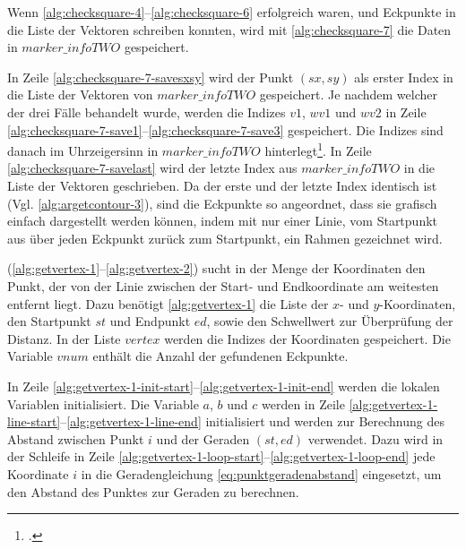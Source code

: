


Wenn \autoref{alg:checksquare-4}--\autoref{alg:checksquare-6} erfolgreich waren, und Eckpunkte in die Liste der
 Vektoren schreiben konnten, wird mit \autoref{alg:checksquare-7} die Daten in $\mathit{marker\_infoTWO}$ gespeichert.



In Zeile \ref{alg:checksquare-7-savesxsy} wird der Punkt $(\mathit{sx},\mathit{sy})$ als erster Index in die Liste der
 Vektoren von $\mathit{marker\_infoTWO}$ gespeichert. Je nachdem welcher der drei Fälle behandelt wurde, werden die
 Indizes $\mathit{v1}$, $\mathit{wv1}$ und $\mathit{wv2}$ in Zeile
 \ref{alg:checksquare-7-save1}--\ref{alg:checksquare-7-save3} gespeichert. Die Indizes sind danach im Uhrzeigersinn in
 $\mathit{marker\_infoTWO}$ hinterlegt\footcite[Vgl.][S.~44]{wagner07a}. In Zeile \ref{alg:checksquare-7-savelast} wird
 der letzte Index aus $\mathit{marker\_infoTWO}$ in die Liste der Vektoren geschrieben. Da der erste und der letzte
 Index identisch ist (Vgl. \autoref{alg:argetcontour-3}), sind die Eckpunkte so angeordnet, dass sie grafisch einfach
 dargestellt werden können, indem mit nur einer Linie, vom Startpunkt aus über jeden Eckpunkt zurück zum Startpunkt,
 ein Rahmen gezeichnet wird.

 (\autoref{alg:getvertex-1}--\autoref{alg:getvertex-2}) sucht in der Menge der Koordinaten den
 Punkt, der von der Linie zwischen der Start- und Endkoordinate am weitesten entfernt liegt. Dazu benötigt
 \autoref{alg:getvertex-1} die Liste der $x$- und $y$-Koordinaten, den Startpunkt $\mathit{st}$ und Endpunkt
 $\mathit{ed}$, sowie den Schwellwert zur Überprüfung der Distanz. In der Liste $\mathit{vertex}$ werden die Indizes
 der Koordinaten gespeichert. Die Variable $\mathit{vnum}$ enthält die Anzahl der gefundenen Eckpunkte.



In Zeile \ref{alg:getvertex-1-init-start}--\ref{alg:getvertex-1-init-end} werden die lokalen Variablen initialisiert.
 Die Variable $a$, $b$ und $c$ werden in Zeile \ref{alg:getvertex-1-line-start}--\ref{alg:getvertex-1-line-end}
 initialisiert und werden zur Berechnung des Abstand zwischen Punkt $i$ und der Geraden $(\mathit{st},\mathit{ed})$
 verwendet. Dazu wird in der Schleife in Zeile \ref{alg:getvertex-1-loop-start}--\ref{alg:getvertex-1-loop-end} jede
 Koordinate $i$ in die Geradengleichung \autoref{eq:punktgeradenabstand} eingesetzt, um den Abstand des Punktes zur
 Geraden zu berechnen.

